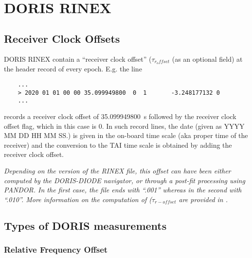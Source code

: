 \chapter{DORIS RINEX}
\label{ch:doris-rinex}

\section{Receiver Clock Offsets}

DORIS RINEX contain a ``receiver clock offset'' (\(\tau_{r_offset}\) (as an optional 
field) at the header record of every epoch. E.g. the line
\begin{verbatim}
    ...
    > 2020 01 01 00 00 35.099949800  0  1       -3.248177132 0
    ...
\end{verbatim}
records a receiver clock offset of \SI{35.099949800}{\second} followed by the receiver 
clock offset flag, which in this case is \num{0}. In such record lines, the date (given 
as YYYY MM DD HH MM SS.) is given in the on-board time scale (aka proper time of 
the receiver) and the conversion to the TAI time scale is obtained by adding the 
receiver clock offset.

\textit{Depending on the version of the RINEX file, this offset can have been either 
computed by the DORIS-DIODE navigator, or through a post-fit processing using PANDOR. 
In the first case, the file ends with ``.001'' whereas in the second with ``.010''. 
More information on the computation of (\(\tau_{r-offset}\) are provided in \cite{lemoine-2016}.}

\section{Types of DORIS measurements}
\label{sec:types-of-doris-measurements}

\subsection{Relative Frequency Offset}
\label{ssec:relative-frequency-offset}

